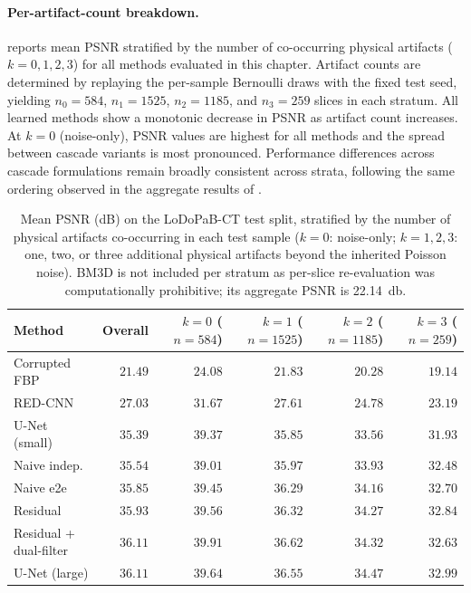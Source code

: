 \paragraph{Per-artifact-count breakdown.}
 reports mean PSNR stratified by the number of co-occurring physical artifacts ($k = 0,1,2,3$) for all methods evaluated in this chapter. Artifact counts are determined by replaying the per-sample Bernoulli draws with the fixed test seed, yielding $n_{0}=584$, $n_{1}=1525$, $n_{2}=1185$, and $n_{3}=259$ slices in each stratum. All learned methods show a monotonic decrease in PSNR as artifact count increases. At $k=0$ (noise-only), PSNR values are highest for all methods and the spread between cascade variants is most pronounced. Performance differences across cascade formulations remain broadly consistent across strata, following the same ordering observed in the aggregate results of .

\begin{table}[!htb]
    \centering
    \caption[Per-artifact-count PSNR breakdown for all evaluated methods.]{%
        Mean PSNR (dB) on the LoDoPaB-CT test split, stratified by the number of
        physical artifacts co-occurring in each test sample ($k=0$: noise-only;
        $k=1,2,3$: one, two, or three additional physical artifacts beyond the
        inherited Poisson noise). BM3D is not included per stratum as per-slice
        re-evaluation was computationally prohibitive; its aggregate PSNR is
        \SI{22.14}{\decibel}.}
    \label{tab:exp_per_artifact}
    \setlength{\tabcolsep}{5pt}
    \small
    \begin{tabular}{@{}l r r r r r@{}}
        \toprule
        Method & Overall & $k{=}0$ ($n{=}584$) & $k{=}1$ ($n{=}1525$) & $k{=}2$ ($n{=}1185$) & $k{=}3$ ($n{=}259$) \\
        \midrule
        Corrupted FBP               & $21.49$ & $24.08$ & $21.83$ & $20.28$ & $19.14$ \\
        RED-CNN~\cite{Chen2017}     & $27.03$ & $31.67$ & $27.61$ & $24.78$ & $23.19$ \\
        \midrule
        U-Net (small)               & $35.39$ & $39.37$ & $35.85$ & $33.56$ & $31.93$ \\
        \quad Naive indep.          & $35.54$ & $39.01$ & $35.97$ & $33.93$ & $32.48$ \\
        \quad Naive e2e             & $35.85$ & $39.45$ & $36.29$ & $34.16$ & $32.70$ \\
        \quad Residual              & $35.93$ & $39.56$ & $36.32$ & $34.27$ & $32.84$ \\
        \quad Residual + dual-filter& $36.11$ & $\mathbf{39.91}$ & $\mathbf{36.62}$ & $34.32$ & $32.63$ \\
        \midrule
        U-Net (large)               & $36.11$ & $39.64$ & $36.55$ & $\mathbf{34.47}$ & $\mathbf{32.99}$ \\
        \bottomrule
    \end{tabular}
\end{table}

